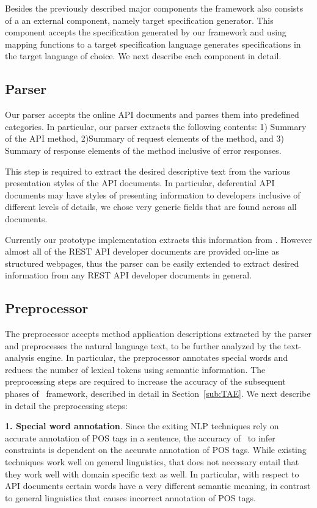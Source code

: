 Besides the previously described major components the framework also consists of a an external component, namely target specification generator. This component accepts the specification generated by our framework and using mapping functions to a target specification language generates specifications in the target language of choice. We next describe each component in detail.


\subsection{Parser}
\label{sub:parser}

Our parser accepts the online API documents and parses them into predefined categories. In particular, our parser extracts the following contents: 1) Summary of the API method, 2)Summary of request elements of the method, and 3) Summary of response elements of the method inclusive of error responses.

This step is required to extract the desired descriptive text from the various presentation styles of the API documents. In particular, deferential API documents may have styles of presenting information to developers inclusive of different levels of details, we chose very generic fields that are found across all documents. 

Currently our prototype implementation extracts this information from \amazon. However almost all of the REST API developer documents are provided on-line as structured webpages, thus the parser can be easily extended to extract desired information from any REST API developer documents in general.    


\subsection{Preprocessor}
\label{sub:Preprocessor}

The preprocessor accepts method application descriptions extracted by the parser and preprocesses the natural language text, to be further analyzed by the text-analysis engine. In particular, the preprocessor annotates special words and reduces the number of lexical tokens using semantic information. The preprocessing steps are required to increase the accuracy of the subsequent phases of \tool\ framework, described in detail in Section~\ref{sub:TAE}. We next describe in detail the preprocessing steps:

\textbf{1. Special word annotation}.
Since the exiting NLP techniques rely on accurate annotation of POS tags in a sentence, the accuracy of \tool\ to infer constraints is dependent on the accurate annotation of POS tags. While existing techniques work well on general linguistics, that does not necessary entail that they work well with domain specific text as well. In particular, with respect to API documents certain words have a very different semantic meaning, in contrast to general linguistics that causes incorrect annotation of POS tags.

